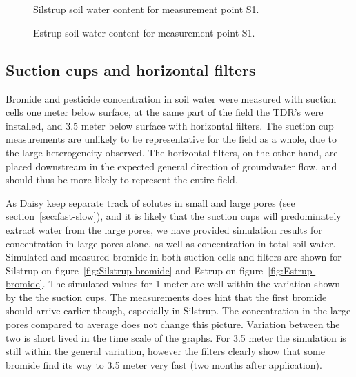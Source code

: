 \begin{figure}[htbp]
  \begin{center}
    \\
    \\
  \end{center}
  \caption{Silstrup soil water content for measurement point S1.}
  \label{fig:Silstrup-theta}
\end{figure}

\begin{figure}[htbp]
  \begin{center}
  \end{center}
  \caption{Estrup soil water content for measurement point S1.}
  \label{fig:Estrup-theta}
\end{figure}

\FloatBarrier
\subsection{Suction cups and horizontal filters}

Bromide and pesticide concentration in soil water were measured with
suction cells one meter below surface, at the same part of the field
the TDR's were installed, and 3.5 meter below surface with horizontal
filters.  The suction cup measurements are unlikely to be
representative for the field as a whole, due to the large
heterogeneity observed.  The horizontal filters, on the other hand,
are placed downstream in the expected general direction of groundwater
flow, and should thus be more likely to represent the entire field.

As Daisy keep separate track of solutes in small and large pores (see
section~\ref{sec:fast-slow}), and it is likely that the suction cups
will predominately extract water from the large pores, we have
provided simulation results for concentration in large pores alone, as
well as concentration in total soil water.  Simulated and measured
bromide in both suction cells and filters are shown for Silstrup on
figure~\ref{fig:Silstrup-bromide} and Estrup on
figure~\ref{fig:Estrup-bromide}.  The simulated values for 1 meter are
well within the variation shown by the the suction cups.  The
measurements does hint that the first bromide should arrive earlier
though, especially in Silstrup.  The concentration in the large pores
compared to average does not change this picture.  Variation between
the two is short lived in the time scale of the graphs.  For 3.5 meter
the simulation is still within the general variation, however the
filters clearly show that some bromide find its way to 3.5 meter very
fast (two months after application).

